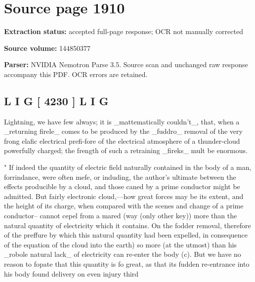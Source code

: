 \clearpage
\section{Source page 1910}
\textbf{Extraction status:} accepted full-page response; OCR not manually corrected\par
\textbf{Source volume:} 144850377\par
\textbf{Parser:} NVIDIA Nemotron Parse 3.5. Source scan and unchanged raw response accompany this PDF. OCR errors are retained.\par\medskip
\subsection*{L I G [ 4230 ] L I G}
Lightning, we have few always; it is \_mattematically couldn’t\_, that, when a \_returning firele\_ comes to be produced by the \_fuddro\_ removal of the very frong elafic electrical prefi-fore of the electrical atmosphere of a thunder-cloud powerfully charged; the frength of such a retraining \_fireks\_ mult be enormous.\par\medskip
" If indeed the quantity of electric field naturally contained in the body of a man, forrindance, were often mefe, or induding, the author's ultimate between the effects producible by a cloud, and those caned by a prime conductor might be admitted. But fairly electronic cloud,—how great forces may be its extent, and the height of its charge, when compared with the scenes and change of a prime conductor-- cannot cepel from a mared (way (only other key)) more than the natural quantity of electricity which it contains. On the fodder removal, therefore of the preffure by which this natural quantity had been expelled, in consequence of the equation of the cloud into the earth) so more (at the utmost) than his \_robole natural lack\_ of electricity can re-enter the body (c). But we have no reason to fopate that this quantity is fo great, as that its fudden re-entrance into his body found delivery on even injury third\par\medskip
